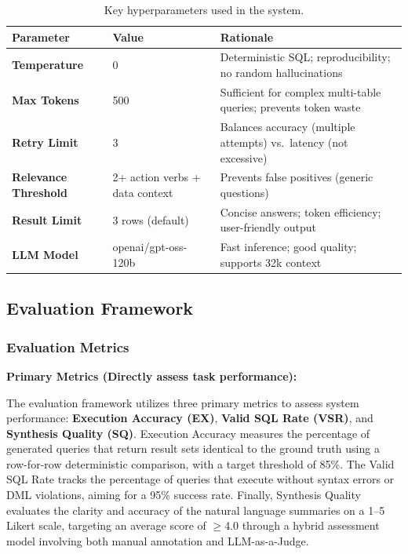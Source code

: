 \documentclass{article}
\begin{document}
\begin{table}[h]
\centering
\small
\begin{tabularx}{\textwidth}{|l|X|X|}
\hline
\textbf{Parameter} & \textbf{Value} & \textbf{Rationale} \\
\hline
\textbf{Temperature} & 0 & Deterministic SQL; reproducibility; no random hallucinations \\
\hline
\textbf{Max Tokens} & 500 & Sufficient for complex multi-table queries; prevents token waste \\
\hline
\textbf{Retry Limit} & 3 & Balances accuracy (multiple attempts) vs.\ latency (not excessive) \\
\hline
\textbf{Relevance Threshold} & 2+ action verbs + data context & Prevents false positives (generic questions) \\
\hline
\textbf{Result Limit} & 3 rows (default) & Concise answers; token efficiency; user-friendly output \\
\hline
\textbf{LLM Model} & openai/gpt-oss-120b & Fast inference; good quality; supports 32k context \\
\hline
\end{tabularx}
\caption{Key hyperparameters used in the system.}
\label{tab:hyperparameters}
\end{table}

\subsection{Evaluation Framework}

\subsubsection{Evaluation Metrics}
\noindent\textbf{Primary Metrics (Directly assess task performance):}

The evaluation framework utilizes three primary metrics to assess system performance: \textbf{Execution Accuracy (EX)}, \textbf{Valid SQL Rate (VSR)}, and \textbf{Synthesis Quality (SQ)}. Execution Accuracy measures the percentage of generated queries that return result sets identical to the ground truth using a row-for-row deterministic comparison, with a target threshold of 85\%. The Valid SQL Rate tracks the percentage of queries that execute without syntax errors or DML violations, aiming for a 95\% success rate. Finally, Synthesis Quality evaluates the clarity and accuracy of the natural language summaries on a 1--5 Likert scale, targeting an average score of $\geq$4.0 through a hybrid assessment model involving both manual annotation and LLM-as-a-Judge.
\end{document}
